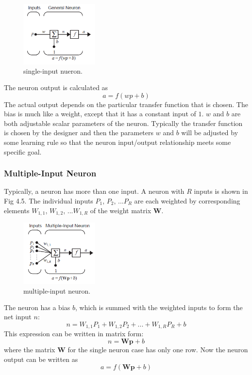 \documentclass[12pt, a4paper, twoside]{report}
\begin{document}
\begin{figure}[ht]
	\centering
	\includegraphics[width=0.35\textwidth]
	{images/chapter4/single_input_neuron}
	\caption{single-input nueron.}
	\label{fig:single_input_neuron}
\end{figure}

The neuron output is calculated as
\begin{equation}
a = f(wp + b)
\end{equation}
The actual output depends on the particular transfer function that is chosen. The bias is much like a weight, except that it has a constant input of $1$. $w$ and $b$ are both adjustable scalar parameters of the neuron. Typically the transfer function is chosen by the designer and then the parameters $w$ and $b$ will be adjusted by some learning rule so that the neuron input/output relationship meets some specific goal.

\subsubsection{Multiple-Input Neuron}
Typically, a neuron has more than one input. A neuron with $R$ inputs is shown in Fig 4.5. The individual inputs $P_1$, $P_2$, ...$P_R$ are each weighted by corresponding elements $W_{1,1}$, $W_{1,2}$, ...$W_{1,R}$ of the weight matrix $\mathbf{W}$.

\begin{figure}[ht]
	\centering
	\includegraphics[width=0.35\textwidth]
	{images/chapter4/multiple_input_neuron}
	\caption{multiple-input neuron.}
	\label{fig:multiple_input_neuron}
\end{figure}

The neuron has a bias $b$, which is summed with the weighted inputs to form the net input $n$:
\begin{equation}
n = W_{1,1}P_{1} + W_{1,2}P_{2} + ... + W_{1,R}P_{R} + b
\end{equation}
This expression can be written in matrix form:
\begin{equation}
n = \mathbf{Wp} + b
\end{equation}
where the matrix $\mathbf{W}$ for the single neuron case has only one row. Now the neuron output can be written as
\begin{equation}
a = f(\mathbf{Wp} + b)
\end{equation}
\end{document}
